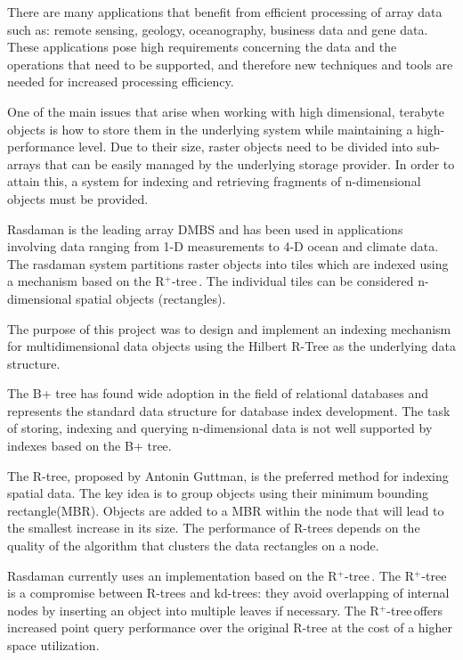 \documentclass[11pt, a4paper, oneside]{article}
\newcommand{\rplus}{R$^+$-tree$\,$}
\begin{document}
There are many applications that benefit from efficient processing of array data such as: remote sensing, geology, oceanography, business data and gene data. These applications pose high requirements concerning the data and the operations that need to be supported, and therefore new techniques and tools are needed for increased processing efficiency.

One of the main issues that arise when working with high dimensional, terabyte objects is how to store them in the underlying system while maintaining a high-performance level. Due to their size, raster objects need to be divided into sub-arrays that can be easily managed by the underlying storage provider. In order to attain this, a system for indexing and retrieving fragments of n-dimensional objects must be provided.

Rasdaman is the leading array DMBS and has been used in applications involving data ranging from 1-D measurements to 4-D ocean and climate data. The rasdaman system partitions raster objects into tiles\cite{DBLP:conf/icde/FurtadoB99} which are indexed using a mechanism based on the \rplus. The individual tiles can be considered n-dimensional spatial objects (rectangles). 

The purpose of this project was to design and implement an indexing mechanism for multidimensional data objects using the Hilbert R-Tree as the underlying data structure.

The B+ tree\cite{Comer:1979:UB:356770.356776} has found wide adoption in the field of relational databases and represents the standard data structure for database index development. The task of storing, indexing and querying n-dimensional data is not well supported by indexes based on the B+ tree. 

The R-tree, proposed by Antonin Guttman\cite{Guttman:1984:RDI:602259.602266}, is the preferred method for indexing spatial data. The key idea is to group objects using their minimum bounding rectangle(MBR). Objects are added to a MBR within the node that will lead to the smallest increase in its size. The performance of R-trees depends on the quality of the algorithm that clusters the data rectangles on a node.

Rasdaman currently uses an implementation based on the \rplus. The \rplus is a compromise between R-trees and kd-trees: they avoid overlapping of internal nodes by inserting an object into multiple leaves if necessary. The \rplus offers increased point query performance over the original R-tree at the cost of a higher space utilization. 
\end{document}
